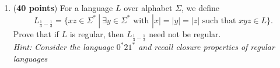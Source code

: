 \documentclass[letterpaper, 12pt]{article}
\theoremstyle{definition}
\numberwithin{equation}{section}
\begin{document}
\begin{enumerate}
\item (\textbf{40 points}) For a language $L$ over alphabet $\Sigma$, we define
$$L_{\frac{1}{3}-\frac{1}{3}} = \{xz \in \Sigma^*\ |\ \exists y \in \Sigma^* \text{ with } |x|=|y|=|z| \text{ such that } xyz \in L\}.$$
Prove that if $L$ is regular, then $L_{\frac{1}{3}-\frac{1}{3}}$ need not be regular. \\
\emph{Hint: Consider the language $0^*21^*$ and recall closure properties of regular languages}
\end{enumerate}
\end{document}

